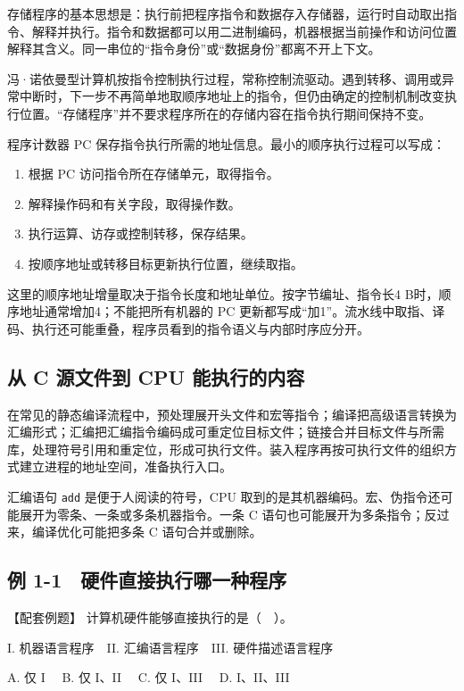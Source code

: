 存储程序的基本思想是：执行前把程序指令和数据存入存储器，运行时自动取出指令、解释并执行。指令和数据都可以用二进制编码，机器根据当前操作和访问位置解释其含义。同一串位的``指令身份''或``数据身份''都离不开上下文。

冯·诺依曼型计算机按指令控制执行过程，常称控制流驱动。遇到转移、调用或异常中断时，下一步不再简单地取顺序地址上的指令，但仍由确定的控制机制改变执行位置。``存储程序''并不要求程序所在的存储内容在指令执行期间保持不变。

程序计数器 PC 保存指令执行所需的地址信息。最小的顺序执行过程可以写成：

\begin{enumerate}
\def\labelenumi{\arabic{enumi}.}
\tightlist
\item
  根据 PC 访问指令所在存储单元，取得指令。
\item
  解释操作码和有关字段，取得操作数。
\item
  执行运算、访存或控制转移，保存结果。
\item
  按顺序地址或转移目标更新执行位置，继续取指。
\end{enumerate}

这里的顺序地址增量取决于指令长度和地址单位。按字节编址、指令长4 B时，顺序地址通常增加4；不能把所有机器的 PC 更新都写成``加1''。流水线中取指、译码、执行还可能重叠，程序员看到的指令语义与内部时序应分开。

\subsection{从 C 源文件到 CPU 能执行的内容}\label{CO01-05}

在常见的静态编译流程中，预处理展开头文件和宏等指令；编译把高级语言转换为汇编形式；汇编把汇编指令编码成可重定位目标文件；链接合并目标文件与所需库，处理符号引用和重定位，形成可执行文件。装入程序再按可执行文件的组织方式建立进程的地址空间，准备执行入口。

汇编语句 \texttt{add} 是便于人阅读的符号，CPU 取到的是其机器编码。宏、伪指令还可能展开为零条、一条或多条机器指令。一条 C 语句也可能展开为多条指令；反过来，编译优化可能把多条 C 语句合并或删除。

\subsection{例 1-1　硬件直接执行哪一种程序}\label{CO01-06}

\begin{example}[配套例题]

【配套例题】 计算机硬件能够直接执行的是（　）。

I. 机器语言程序　II. 汇编语言程序　III. 硬件描述语言程序

A. 仅 I　 B. 仅 I、II　 C. 仅 I、III　 D. I、II、III

\end{example}

